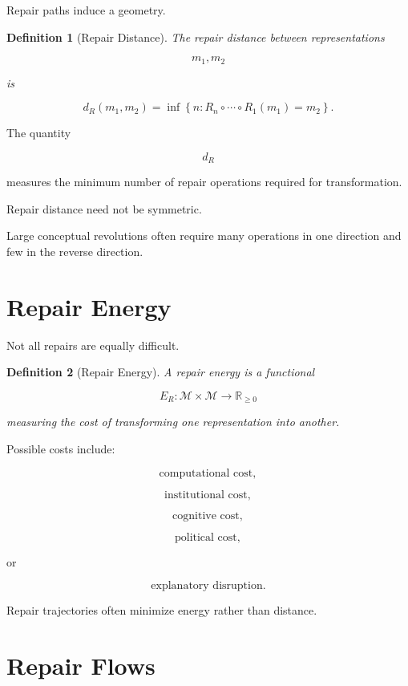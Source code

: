 \documentclass[11pt,oneside,openany]{book}
\newtheorem{definition}{Definition}[chapter] \newtheorem{theorem}{Theorem}[chapter] \newtheorem{proposition}{Proposition}[chapter] \newtheorem{lemma}{Lemma}[chapter] \newtheorem{corollary}{Corollary}[chapter] \newtheorem{remark}{Remark}[chapter]
\begin{document}
Repair paths induce a geometry.

\begin{definition}[Repair Distance]

The repair distance between representations

\[
m_1,m_2
\]

is

\[
d_R(m_1,m_2)
=
\inf
\left\{
n:
R_n\circ\cdots\circ R_1(m_1)
=
m_2
\right\}.
\]

\end{definition}

The quantity

\[
d_R
\]

measures the minimum number of repair operations required for transformation.

Repair distance need not be symmetric.

Large conceptual revolutions often require many operations in one direction and few in the reverse direction.

\section{Repair Energy}

Not all repairs are equally difficult.

\begin{definition}[Repair Energy]

A repair energy is a functional

\[
E_R:\mathcal M\times\mathcal M
\rightarrow
\mathbb R_{\ge0}
\]

measuring the cost of transforming one representation into another.

\end{definition}

Possible costs include:

\[
\text{computational cost},
\]

\[
\text{institutional cost},
\]

\[
\text{cognitive cost},
\]

\[
\text{political cost},
\]

or

\[
\text{explanatory disruption}.
\]

Repair trajectories often minimize energy rather than distance.

\section{Repair Flows}
\end{document}
